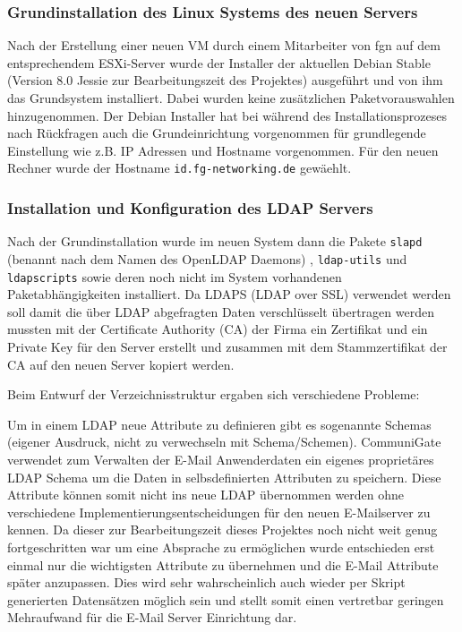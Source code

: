 \documentclass[11pt,a4paper,titlepage=firstiscover]{scrartcl} %
\begin{document}
\subsubsection{Grundinstallation des Linux Systems des neuen Servers}
Nach der Erstellung einer neuen VM durch einem Mitarbeiter von fgn auf dem entsprechendem ESXi-Server wurde der Installer der aktuellen Debian Stable (Version 8.0 Jessie zur Bearbeitungszeit des Projektes) ausgeführt und von ihm das Grundsystem installiert. Dabei wurden keine zusätzlichen Paketvorauswahlen hinzugenommen.  Der Debian Installer hat bei während des Installationsprozeses nach Rückfragen auch die Grundeinrichtung vorgenommen für grundlegende Einstellung wie z.B. IP Adressen und Hostname vorgenommen. Für den neuen Rechner wurde der Hostname \texttt{id.fg-networking.de} gewäehlt.

\subsubsection{Installation und Konfiguration des LDAP Servers}
Nach der Grundinstallation wurde im neuen System dann die Pakete \texttt{slapd} (benannt nach dem Namen des OpenLDAP Daemons) , \texttt{ldap-utils} und \texttt{ldapscripts} sowie deren noch nicht im System vorhandenen Paketabhängigkeiten installiert. Da LDAPS (LDAP over SSL) verwendet werden soll damit die über LDAP abgefragten Daten verschlüsselt übertragen werden mussten mit der Certificate Authority (CA) der Firma ein Zertifikat und ein Private Key für den Server erstellt und zusammen mit dem Stammzertifikat der CA auf den neuen Server kopiert werden.\newline

Beim Entwurf der Verzeichnisstruktur ergaben sich verschiedene Probleme:

\noindent Um in einem LDAP neue Attribute zu definieren gibt es sogenannte Schemas (eigener Ausdruck, nicht zu verwechseln mit Schema/Schemen). CommuniGate verwendet zum Verwalten der E-Mail Anwenderdaten ein eigenes proprietäres LDAP Schema um die Daten in selbsdefinierten Attributen zu speichern. Diese Attribute können somit nicht ins neue LDAP übernommen werden ohne verschiedene Implementierungsentscheidungen für den neuen E-Mailserver zu kennen. Da dieser zur Bearbeitungszeit dieses Projektes noch nicht weit genug fortgeschritten war um eine Absprache zu ermöglichen wurde entschieden erst einmal nur die wichtigsten Attribute zu übernehmen und die E-Mail Attribute später anzupassen. Dies wird sehr wahrscheinlich auch wieder per Skript generierten Datensätzen möglich sein und stellt somit einen vertretbar geringen Mehraufwand für die E-Mail Server Einrichtung dar.
\end{document}
